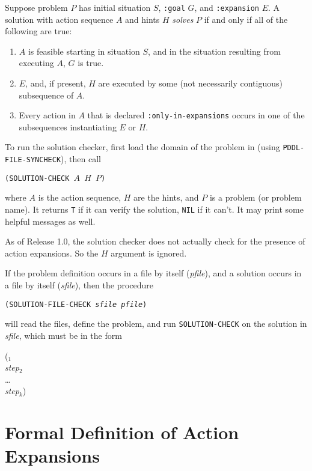 Suppose problem $P$ has initial situation $S$, {\tt :goal} $G$, and {\tt :expansion} $E$.
A solution with action sequence $A$ and hints $H$ 
{\em solves} $P$ if and only if all of the following are
true:
\begin{enumerate}
\item $A$ is feasible starting in situation $S$, and in the situation
resulting from executing $A$, $G$ is true.
\item $E$, and, if present, $H$ are executed by some (not necessarily
contiguous) subsequence of $A$.
\item Every action in $A$ that is declared {\tt :only-in-expansions}
occurs in one of the subsequences instantiating $E$ or $H$.
\end{enumerate}

To run the solution checker, first load the domain of the problem in
(using {\tt PDDL-FILE-SYNCHECK}), then 
call 
\begin{center}
\tt (SOLUTION-CHECK $A$ $H$ $P$)
\end{center}
where $A$ is the action sequence, $H$ are the hints, and $P$ is a
problem (or problem name).  It returns {\tt T} if it can verify the
solution, {\tt NIL} if it can't.  It may print some helpful messages
as well.

As of Release 1.0, the solution checker does not actually check for
the presence of action expansions.  So the $H$ argument is ignored.

If the problem definition occurs in a file by itself ({\it pfile}),
and a solution occurs in a file by itself ({\it sfile}), then the
procedure
\begin{center}
\tt (SOLUTION-FILE-CHECK {\it sfile} {\it pfile})
\end{center}
will read the files, define the problem, and run {\tt SOLUTION-CHECK}
on the solution in {\it sfile}, which must be in the form
\begin{tabtt}
($_1$ \+\\
 {\it step}$_2$ \\
 \ldots \\
 {\it step}$_k$) \-
\end{tabtt}



\appendix

\section{Formal Definition of Action Expansions}
\label{satis}

